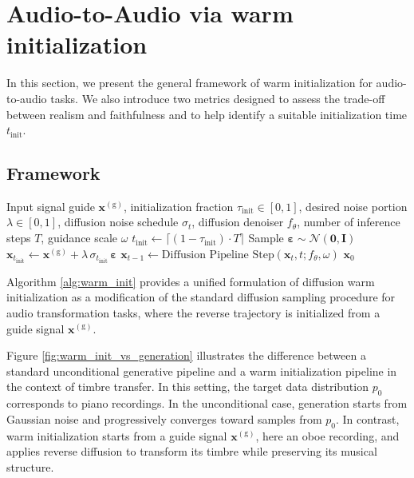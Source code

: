 \section{Audio-to-Audio via warm initialization}
\label{Method}
In this section, we present the general framework of warm initialization for audio-to-audio tasks. We also introduce two metrics designed to assess the trade-off between realism and faithfulness and to help identify a suitable initialization time $t_\text{init}$.

\subsection{Framework}
\begin{algorithm}[!t]
\caption{Diffusion Warm Initialization}
\begin{algorithmic}[1]
\Require Input signal guide $\mathbf{x}^{(\mathrm g)}$, initialization fraction $\tau_\text{init}\in [0,1]$, desired noise portion $\lambda  \in [0,1]$, diffusion noise schedule $ \sigma_t$, diffusion denoiser $f_\theta$, number of inference steps $T$, guidance scale $\omega$
\State $t_\text{init} \gets \lceil (1 - \tau_\text{init})\cdot T \rceil$
\State Sample $\boldsymbol \varepsilon \sim \mathcal{N}(\mathbf 0, \mathbf I)$
\State $\mathbf{x}_{t_\text{init}} \gets  \mathbf{x}^{(\mathrm g)} + \lambda \,\sigma_{t_\text{init}}\, \boldsymbol \varepsilon$
    \State $\mathbf{x}_{t-1} \gets \text{Diffusion Pipeline Step}(\mathbf{x}_t, t; f_\theta, \omega)$
\EndFor
\State \Return $\mathbf{x}_0$
\end{algorithmic}
\label{alg:warm_init}
\end{algorithm}

Algorithm \ref{alg:warm_init} provides a unified formulation of diffusion warm initialization as a modification of the standard diffusion sampling procedure for audio transformation tasks, where the reverse trajectory is initialized from a guide signal $\mathbf{x}^{(\mathrm g)} $.

Figure \ref{fig:warm_init_vs_generation} illustrates the difference between a standard unconditional generative pipeline and a warm initialization pipeline in the context of timbre transfer. In this setting, the target data distribution $p_0$ corresponds to piano recordings. In the unconditional case, generation starts from Gaussian noise and progressively converges toward samples from $p_0$. In contrast, warm initialization starts from a guide signal $\mathbf{x}^{(\mathrm g)}$, here an oboe recording, and applies reverse diffusion to transform its timbre while preserving its musical structure.

